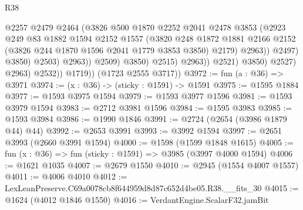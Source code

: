 \begin{lexlean}{R38}
\begin{coremodule}
                                          @2257
                                          @2479
                                          @2464
                                          (@3826
                                            @500
                                            @1870
                                            @2252
                                            @2041
                                            @2478
                                            @3853
                                            (@2923
                                              @249
                                              @83
                                              @1882
                                              @1594
                                              @2152
                                              @1557
                                              (@3820
                                                @248
                                                @1872
                                                @1881
                                                @2166
                                                @2152
                                                (@3826 @244 @1870 @1596 @2041 @1779 @3853 @3850)
                                                @2179)
                                              @2963))
                                          @2497)
                                        @3850)
                                      @2503)
                                    @2963))
                                @2509)
                              @3850)
                            @2515)
                          @2963))
                      @2521)
                    @3850)
                  @2527)
                @2963)
              @2532))
          @1719))
      (@1723 @2555 @3717))
@3972 := fun (a : @36) => @3971
@3974 := (x : @36) -> (sticky : @1591) -> @1591
@3975 := @1595 @1884
@3977 := @1593 @3975 @1594
@3979 := @1593 @3977 @1596
@3981 := @1593 @3979 @1594
@3983 := @2712 @3981 @1596
@3984 := @1595 @3983
@3985 := @1593 @3984
@3986 := @1990 @1846
@3991 := @2724 (@2654 (@3986 @1879 @44) @44)
@3992 := @2653 @3991
@3993 := @3992 @1594
@3997 := @2651 @3993 (@2660 @3991 @1594)
@4000 := @1598 (@1599 @1848 @1615)
@4005 := fun (x : @36) => fun (sticky : @1591) => @3985 (@3997 @4000 @1594)
@4006 := @1621 @1035
@4007 := @2679 @1550
@4010 := @2945 (@1554 @4007 @1557)
@4011 := @4006 @4010
@4012 := LexLeanPreserve.C69a0078cb8f644959d8d87c652d4be05.R38.__fits_30
@4015 := @1624 (@4012 @1846 @1550)
@4016 := VerdantEngine.ScalarF32.jamBit

\end{coremodule}
\end{lexlean}
